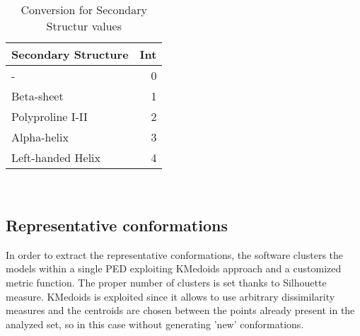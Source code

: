 \begin{table}[H]
\begin{center}
\begin{tabular}{lr}
\textbf{Secondary Structure} & \textbf{Int}\\
\hline
- & 0\\
\hline
Beta-sheet & 1\\
\hline
Polyproline I-II & 2\\
\hline
Alpha-helix & 3\\
\hline
Left-handed Helix & 4\\
\end{tabular}
\end{center}
\caption{Conversion for Secondary Structur values}~\label{tab:ss}
\end{table}


\subsection{Representative conformations} 
In order to extract the representative conformations, the software clusters the models within a single PED exploiting KMedoids approach and a customized metric function. The proper number of clusters is set thanks to Silhouette measure. 
KMedoids is exploited since it allows to use arbitrary dissimilarity measures and the centroids are chosen between the points already present in the analyzed set, so in this case without generating 'new' conformations. 

